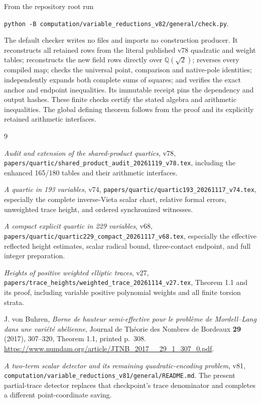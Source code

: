 \documentclass[11pt]{article}
\theoremstyle{remark}\newtheorem{remark}[theorem]{Remark}
\newcommand{\Q}{\mathbb Q}\newcommand{\Z}{\mathbb Z}
\begin{document}
From the repository root run
\begin{center}\small
\texttt{python -B computation/variable\_reductions\_v82/general/check.py}.
\end{center}
The default checker writes no files and imports no construction
producer. It reconstructs all retained rows from the literal
published v78 quadratic and weight tables; reconstructs the new
field rows directly over $\Q(\sqrt2)$; reverses every compiled
map; checks the universal point, comparison and native-pole
identities; independently expands both complete sums of squares;
and verifies the exact anchor and endpoint inequalities.
Its immutable receipt pins the dependency and output hashes.
These finite checks certify the stated algebra and arithmetic
inequalities. The global defining theorem follows from the proof
and its explicitly retained arithmetic interfaces.

\begin{thebibliography}{9}\raggedright
{}
\emph{Audit and extension of the shared-product quartics}, v78,
\nolinkurl{papers/quartic/shared_product_audit_20261119_v78.tex},
including the enhanced 165/180 tables and their arithmetic interfaces.

\emph{A quartic in 193 variables}, v74,
\nolinkurl{papers/quartic/quartic193_20261117_v74.tex},
especially the complete inverse-Vieta scalar chart, relative formal
errors, unweighted trace height, and ordered synchronized witnesses.

\emph{A compact explicit quartic in 229 variables}, v68,
\nolinkurl{papers/quartic/quartic229_compact_20261117_v68.tex},
especially the effective reflected height estimates, scalar radical
bound, three-contact endpoint, and full integer preparation.

\emph{Heights of positive weighted elliptic traces}, v27,
\nolinkurl{papers/trace_heights/weighted_trace_20261114_v27.tex},
Theorem 1.1 and its proof, including variable positive polynomial
weights and all finite torsion strata.

J. von Buhren, \emph{Borne de hauteur semi-effective pour le
probl\`eme de Mordell--Lang dans une vari\'et\'e ab\'elienne},
Journal de Th\'eorie des Nombres de Bordeaux \textbf{29} (2017),
307--320, Theorem 1.1, printed p.~308.
\url{https://www.numdam.org/article/JTNB_2017__29_1_307_0.pdf}.

\emph{A two-term scalar detector and its remaining quadratic-encoding
problem}, v81,
\nolinkurl{computation/variable_reductions_v81/general/README.md}.
The present partial-trace detector replaces that checkpoint's trace
denominator and completes a different point-coordinate saving.
\end{thebibliography}
\end{document}

